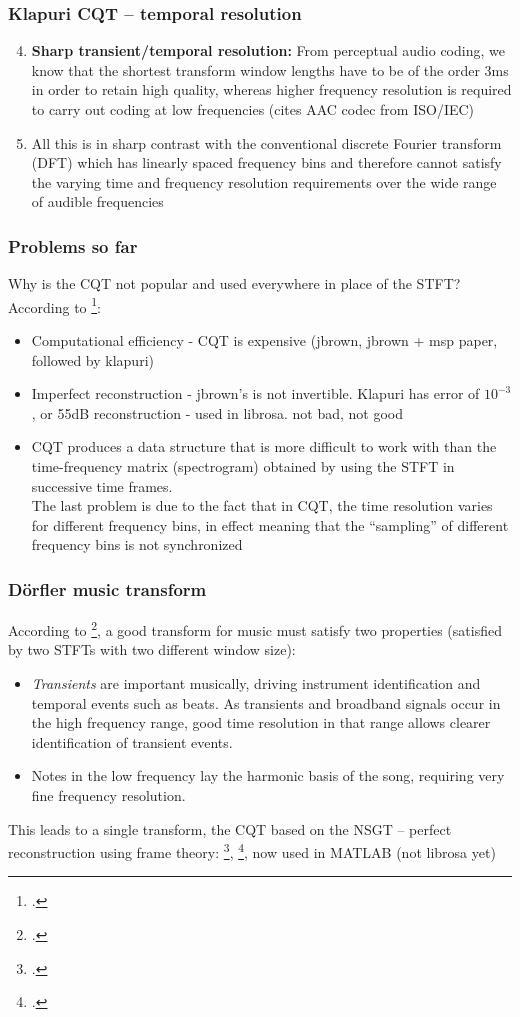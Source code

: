 \documentclass[usenames,dvipsnames]{beamer}
\begin{document}
\begin{frame}
	\frametitle{Klapuri CQT -- temporal resolution}
	\begin{enumerate}
		\setcounter{enumi}{3}
		\item
			 \textbf{Sharp transient/temporal resolution:} From perceptual audio coding, we know that the shortest transform window lengths have to be of the order 3ms in order to retain high quality, whereas higher frequency resolution is required to carry out coding at low frequencies (cites AAC codec from ISO/IEC)
		\item
			All this is in sharp contrast with the conventional discrete Fourier transform (DFT) which has linearly spaced frequency bins and therefore cannot satisfy the varying time and frequency resolution requirements over the wide range of audible frequencies
	\end{enumerate}
\end{frame}

\begin{frame}
	\frametitle{Problems so far}
	Why is the CQT not popular and used everywhere in place of the STFT? According to \footcite{cqtklapuri}:
	\begin{itemize}
		\item
			Computational efficiency - CQT is expensive (jbrown, jbrown + msp paper, followed by klapuri)
		\item
			Imperfect reconstruction - jbrown's is not invertible. Klapuri has error of $10^{-3}$, or 55dB reconstruction - used in librosa. not bad, not good
		\item
			CQT produces a data structure that is more difficult to work with than the time-frequency matrix (spectrogram) obtained by using the STFT in successive time frames.\\
			The last problem is due to the fact that in CQT, the time resolution varies for different frequency bins, in effect meaning that the ``sampling'' of different frequency bins is not synchronized
	\end{itemize}
\end{frame}

\begin{frame}
	\frametitle{D{\"o}rfler music transform}
	According to \footcite{doerflerphd}, a good transform for music must satisfy two properties (satisfied by two STFTs with two different window size):
\begin{itemize}
	\item
		\textit{Transients} are important musically, driving instrument identification and temporal events such as beats. As transients and broadband signals occur in the high frequency range, good time resolution in that range allows clearer identification of transient events.
	\item
		 Notes in the low frequency lay the harmonic basis of the song, requiring very fine frequency resolution.
\end{itemize}
	This leads to a single transform, the CQT based on the NSGT -- perfect reconstruction using frame theory: \footcite{balazs}, \footcite{invertiblecqt}, now used in MATLAB (not librosa yet)
\end{frame}
\end{document}
